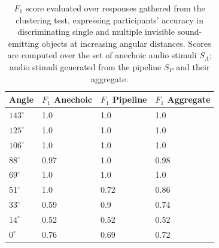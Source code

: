 \begin{table}[htbp]
\centering
\caption[Psychoacoustic test results --- clustering scores]{$F_1$ score evaluated over responses gathered from the clustering test, expressing participants' accuracy in discriminating single and multiple invisible sound-emitting objects at increasing angular distances. Scores are computed over the set of anechoic audio stimuli $S_A$; audio stimuli generated from the pipeline $S_P$ and their aggregate.}\label{tab:f1-masking}
\begin{tabular}{@{}llll@{}}
\toprule
Angle       & $F_1$ Anechoic & $F_1$ Pipeline & $F_1$ Aggregate \\ \midrule
$143^\circ$ & 1.0            & 1.0            & 1.0             \\
$125^\circ$ & 1.0            & 1.0            & 1.0             \\
$106^\circ$ & 1.0            & 1.0            & 1.0             \\
$ 88^\circ$ & 0.97           & 1.0            & 0.98            \\
$ 69^\circ$ & 1.0            & 1.0            & 1.0             \\
$ 51^\circ$ & 1.0            & 0.72           & 0.86            \\
$ 33^\circ$ & 0.59           & 0.9            & 0.74            \\
$ 14^\circ$ & 0.52           & 0.52           & 0.52            \\
$  0^\circ$ & 0.76           & 0.69           & 0.72            \\ \bottomrule
\end{tabular}
\end{table}

